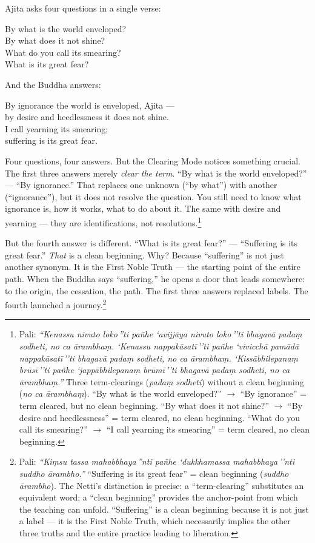 Ajita asks four questions in a single verse:

\begin{versebox}
By what is the world enveloped?\\
By what does it not shine?\\
What do you call its smearing?\\
What is its great fear?
\end{versebox}

And the Buddha answers:

\begin{versebox}
By ignorance the world is enveloped, Ajita ---\\
by desire and heedlessness it does not shine.\\
I call yearning its smearing;\\
suffering is its great fear.
\end{versebox}

Four questions, four answers. But the Clearing Mode notices something crucial. The first three answers merely \textit{clear the term}. ``By what is the world enveloped?'' --- ``By ignorance.'' That replaces one unknown (``by what'') with another (``ignorance''), but it does not resolve the question. You still need to know what ignorance is, how it works, what to do about it. The same with desire and yearning --- they are identifications, not resolutions.\footnote{Pali: \textit{``Kenassu nivuto loko\,''ti pañhe `avijjāya nivuto loko\,''ti bhagavā padaṃ sodheti, no ca ārambhaṃ. `Kenassu nappakāsatī\,''ti pañhe `vivicchā pamādā nappakāsatī\,''ti bhagavā padaṃ sodheti, no ca ārambhaṃ. `Kissābhilepanaṃ brūsī\,''ti pañhe `jappābhilepanaṃ brūmī\,''ti bhagavā padaṃ sodheti, no ca ārambhaṃ.''} Three term-clearings (\textit{padaṃ sodheti}) without a clean beginning (\textit{no ca ārambhaṃ}). ``By what is the world enveloped?'' $\to$ ``By ignorance'' = term cleared, but no clean beginning. ``By what does it not shine?'' $\to$ ``By desire and heedlessness'' = term cleared, no clean beginning. ``What do you call its smearing?'' $\to$ ``I call yearning its smearing'' = term cleared, no clean beginning.}

But the fourth answer is different. ``What is its great fear?'' --- ``Suffering is its great fear.'' \textit{That} is a clean beginning. Why? Because ``suffering'' is not just another synonym. It is the First Noble Truth --- the starting point of the entire path. When the Buddha says ``suffering,'' he opens a door that leads somewhere: to the origin, the cessation, the path. The first three answers replaced labels. The fourth launched a journey.\footnote{Pali: \textit{``Kiṃsu tassa mahabbhaya\,''nti pañhe `dukkhamassa mahabbhaya\,''nti suddho ārambho.''} ``Suffering is its great fear'' = clean beginning (\textit{suddho ārambho}). The Netti's distinction is precise: a ``term-clearing'' substitutes an equivalent word; a ``clean beginning'' provides the anchor-point from which the teaching can unfold. ``Suffering'' is a clean beginning because it is not just a label --- it is the First Noble Truth, which necessarily implies the other three truths and the entire practice leading to liberation.}

